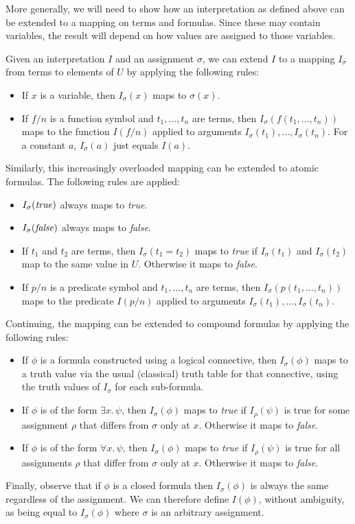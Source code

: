 More generally,
we will need to show how an interpretation as defined above
can be extended to a mapping on terms and formulas.
Since these may contain variables,
the result will depend on how values are assigned to those variables.

Given an interpretation $I$ and an assignment $\sigma$,
we can extend $I$ to a mapping $I_\sigma$
from terms to elements of $U$
by applying the following rules:
\begin{itemize}
\item
If $x$ is a variable, then $I_\sigma(x)$ maps to $\sigma(x)$.
\item
If $f\!/n$ is a function symbol and $t_1, \ldots, t_n$ are terms,
then $I_\sigma(f(t_1, \ldots, t_n))$ maps to
the function $I(f\!/n)$ applied to arguments
$I_\sigma(t_1), \ldots, I_\sigma(t_n)$.
For a constant $a$, $I_\sigma(a)$ just equals $I(a)$.
\end{itemize}
Similarly,
this increasingly overloaded mapping
can be extended to atomic formulas.
The following rules are applied:
\begin{itemize}
\item
$I_\sigma(\text{\textit{true}})$ always maps to \textit{true}.
\item
$I_\sigma(\text{\textit{false}})$ always maps to \textit{false}.
\item
If $t_1$ and $t_2$ are terms,
then $I_\sigma(t_1 = t_2)$ maps to \textit{true}
if $I_\sigma(t_1)$ and $I_\sigma(t_2)$ map to the same value in $U$.
Otherwise it maps to \textit{false}.
\item
If $p/n$ is a predicate symbol and $t_1, \ldots, t_n$ are terms,
then $I_\sigma(p(t_1, \ldots, t_n))$ maps to
the predicate $I(p/n)$ applied to arguments
$I_\sigma(t_1), \ldots, I_\sigma(t_n)$.
\end{itemize}
Continuing,
the mapping can be extended to compound formulas
by applying the following rules:
\begin{itemize}
\item
If $\phi$ is a formula constructed using a logical connective,
then $I_\sigma(\phi)$ maps to a truth value
via the usual (classical) truth table for that connective,
using the truth values of $I_\sigma$ for each sub-formula.
\item
If $\phi$ is of the form $\exists x.\, \psi$,
then $I_\sigma(\phi)$ maps to \textit{true} if $I_\rho(\psi)$ is true
for some assignment $\rho$ that differs from $\sigma$ only at $x$.
Otherwise it maps to \textit{false}.
\item
If $\phi$ is of the form $\forall x.\, \psi$,
then $I_\sigma(\phi)$ maps to \textit{true} if $I_\rho(\psi)$ is true
for all assignments $\rho$ that differ from $\sigma$ only at $x$.
Otherwise it maps to \textit{false}.
\end{itemize}
Finally, observe that if $\phi$ is a closed formula
then $I_\sigma(\phi)$ is always the same
regardless of the assignment.
We can therefore define $I(\phi)$,
without ambiguity,
as being equal to $I_\sigma(\phi)$
where $\sigma$ is an arbitrary assignment.

